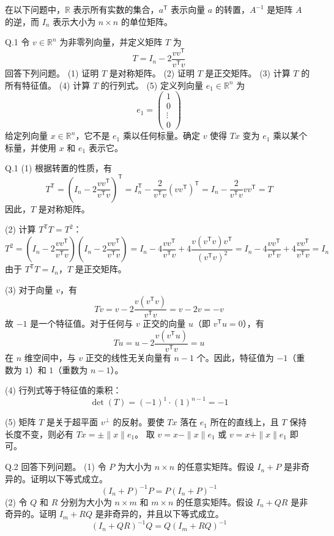 \begin{questions}
    \question 在以下问题中，$\mathbb{R}$ 表示所有实数的集合，$a^{\mathsf{T}}$ 表示向量 $a$ 的转置，$A^{-1}$ 是矩阵 $A$ 的逆，而 $I_n$ 表示大小为 $n \times n$ 的单位矩阵。

Q.1 令 $v \in \mathbb{R}^n$ 为非零列向量，并定义矩阵 $T$ 为
\[
T = I_n - 2 \frac{v v^{\mathsf{T}}}{v^{\mathsf{T}} v}
\]
回答下列问题。
(1) 证明 $T$ 是对称矩阵。
(2) 证明 $T$ 是正交矩阵。
(3) 计算 $T$ 的所有特征值。
(4) 计算 $T$ 的行列式。
(5) 定义列向量 $e_1 \in \mathbb{R}^n$ 为
\[
e_1 = \begin{pmatrix} 1 \\ 0 \\ \vdots \\ 0 \end{pmatrix}
\]
给定列向量 $x \in \mathbb{R}^n$，它不是 $e_1$ 乘以任何标量。确定 $v$ 使得 $Tx$ 变为 $e_1$ 乘以某个标量，并使用 $x$ 和 $e_1$ 表示它。
\begin{solution}
    Q.1
(1)
根据转置的性质，有
\[
T^{\mathsf{T}} = \left( I_n - 2 \frac{v v^{\mathsf{T}}}{v^{\mathsf{T}} v} \right)^{\mathsf{T}} = I_n^{\mathsf{T}} - \frac{2}{v^{\mathsf{T}} v} (v v^{\mathsf{T}})^{\mathsf{T}} = I_n - \frac{2}{v^{\mathsf{T}} v} v v^{\mathsf{T}} = T
\]
因此，$T$ 是对称矩阵。

(2)
计算 $T^{\mathsf{T}} T = T^2$：
\[
T^2 = \left( I_n - 2 \frac{v v^{\mathsf{T}}}{v^{\mathsf{T}} v} \right) \left( I_n - 2 \frac{v v^{\mathsf{T}}}{v^{\mathsf{T}} v} \right) = I_n - 4 \frac{v v^{\mathsf{T}}}{v^{\mathsf{T}} v} + 4 \frac{v (v^{\mathsf{T}} v) v^{\mathsf{T}}}{(v^{\mathsf{T}} v)^2} = I_n - 4 \frac{v v^{\mathsf{T}}}{v^{\mathsf{T}} v} + 4 \frac{v v^{\mathsf{T}}}{v^{\mathsf{T}} v} = I_n
\]
由于 $T^{\mathsf{T}} T = I_n$，$T$ 是正交矩阵。

(3)
对于向量 $v$，有
\[
Tv = v - 2 \frac{v (v^{\mathsf{T}} v)}{v^{\mathsf{T}} v} = v - 2v = -v
\]
故 $-1$ 是一个特征值。对于任何与 $v$ 正交的向量 $u$（即 $v^{\mathsf{T}} u = 0$），有
\[
Tu = u - 2 \frac{v (v^{\mathsf{T}} u)}{v^{\mathsf{T}} v} = u
\]
在 $n$ 维空间中，与 $v$ 正交的线性无关向量有 $n-1$ 个。因此，特征值为 $-1$（重数为 $1$）和 $1$（重数为 $n-1$）。

(4)
行列式等于特征值的乘积：
\[
\det(T) = (-1)^1 \cdot (1)^{n-1} = -1
\]

(5)
矩阵 $T$ 是关于超平面 $v^{\perp}$ 的反射。要使 $Tx$ 落在 $e_1$ 所在的直线上，且 $T$ 保持长度不变，则必有 $Tx = \pm \|x\| e_1$。
取 $v = x - \|x\| e_1$ 或 $v = x + \|x\| e_1$ 即可。
\end{solution}

\question Q.2 回答下列问题。
(1) 令 $P$ 为大小为 $n \times n$ 的任意实矩阵。假设 $I_n + P$ 是非奇异的。证明以下等式成立。
\[
(I_n + P)^{-1} P = P (I_n + P)^{-1}
\]
(2) 令 $Q$ 和 $R$ 分别为大小为 $n \times m$ 和 $m \times n$ 的任意实矩阵。假设 $I_n + QR$ 是非奇异的。证明 $I_m + RQ$ 是非奇异的，并且以下等式成立。
\[
(I_n + QR)^{-1} Q = Q (I_m + RQ)^{-1}
\]


\end{questions}
